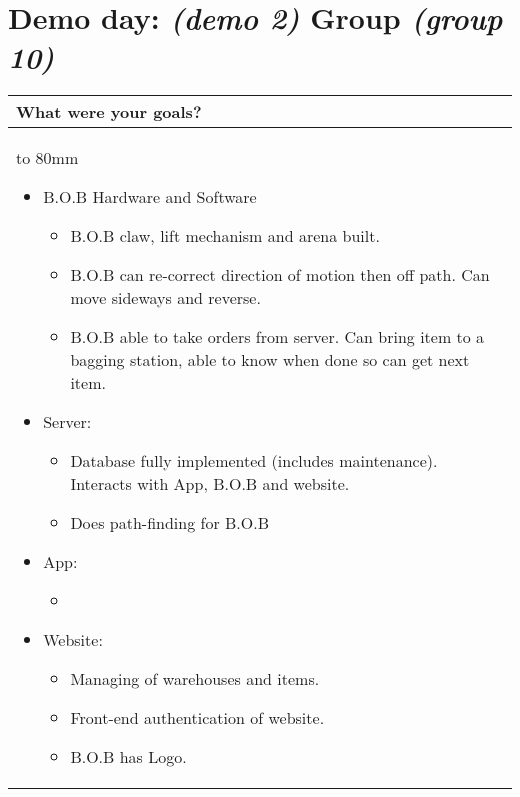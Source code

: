 \documentclass[a4paper]{article}
\newcommand{\colWidth}{141mm}
\begin{document}
 
\section*{Demo day: \textit{(demo 2)} Group \textit{(group 10)}}


\begin{center}
\begin{tabular}{|p{\colWidth}|}
	\hline
	\cellcolor{blue!25}\large
	\textbf{What were your goals?}
	\\ \hline
	\vtop to 80mm{
\begin{itemize}
    \item B.O.B Hardware and Software
    \begin{itemize}
         \item B.O.B claw, lift mechanism and arena built. 
        \item B.O.B can re-correct direction of motion then off path. Can move sideways and reverse.
        \item B.O.B able to take orders from server. Can bring item to a bagging station, able to know when done so can get next item.
    \end{itemize}
    \item Server: 
    \begin{itemize}
        \item Database fully implemented (includes maintenance). Interacts with App, B.O.B and website.
        \item Does path-finding for B.O.B
    \end{itemize}
    \item App:
    \begin{itemize}
        \item 
    \end{itemize}
    \item Website: 
    \begin{itemize}
        \item Managing of warehouses and items.
        \item Front-end authentication of website. 
        \item B.O.B has Logo. 
    \end{itemize}
\end{itemize}
  }
  \\
  \hline
\end{tabular}
\vskip 5mm


\end{center}
\end{document}
